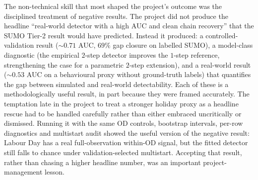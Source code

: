 The non-technical skill that most shaped the project's outcome was the
disciplined treatment of negative results. The
project did not produce the headline ``real-world detector with a
high AUC and clean chain recovery'' that the SUMO Tier-2 result would
have predicted. Instead it produced: a controlled-validation result
($\sim 0.71$ AUC, $69\%$ gap closure on labelled SUMO), a model-class
diagnostic (the empirical $2$-step detector improves the $1$-step
reference, strengthening the case for a parametric $2$-step
extension), and a real-world result ($\sim 0.53$ AUC on a
behavioural proxy without ground-truth labels) that quantifies the gap
between simulated and real-world detectability. Each of these is a
methodologically useful result, in part because they were framed
accurately. The temptation late in the project to treat a stronger
holiday proxy as a headline rescue had to be handled carefully rather
than either embraced uncritically or dismissed. Running it with the same
OD controls, bootstrap intervals, per-row diagnostics and multistart
audit showed the useful version of the negative result: Labour Day has a
real full-observation within-OD signal, but the fitted detector still
falls to chance under validation-selected multistart. Accepting that
result, rather than chasing a higher headline number, was an important
project-management lesson.
